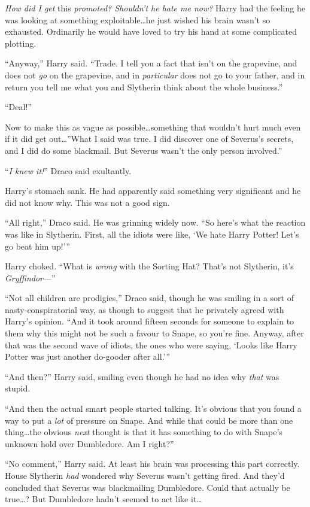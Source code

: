 \emph{How did I get} this \emph{promoted? Shouldn’t he hate me now?} Harry had the feeling he was looking at something exploitable…he just wished his brain wasn’t so exhausted. Ordinarily he would have loved to try his hand at some complicated plotting.

“Anyway,” Harry said. “Trade. I tell you a fact that isn’t on the grapevine, and does not \emph{go} on the grapevine, and in \emph{particular} does not go to your father, and in return you tell me what you and Slytherin think about the whole business.”

“Deal!”

Now to make this as vague as possible…something that wouldn’t hurt much even if it did get out…”What I said was true. I did discover one of Severus’s secrets, and I did do some blackmail. But Severus wasn’t the only person involved.”

“\emph{I knew it!}” Draco said exultantly.

Harry’s stomach sank. He had apparently said something very significant and he did not know why. This was not a good sign.

“All right,” Draco said. He was grinning widely now. “So here’s what the reaction was like in Slytherin. First, all the idiots were like, ‘We hate Harry Potter! Let’s go beat him up!’”

Harry choked. “What is \emph{wrong} with the Sorting Hat? That’s not Slytherin, it’s \emph{Gryffindor}—”

“Not all children are prodigies,” Draco said, though he was smiling in a sort of nasty-conspiratorial way, as though to suggest that he privately agreed with Harry’s opinion. “And it took around fifteen seconds for someone to explain to them why this might not be such a favour to Snape, so you’re fine. Anyway, after that was the second wave of idiots, the ones who were saying, ‘Looks like Harry Potter was just another do-gooder after all.’”

“And then?” Harry said, smiling even though he had no idea why \emph{that} was stupid.

“And then the actual smart people started talking. It’s obvious that you found a way to put a \emph{lot} of pressure on Snape. And while that could be more than one thing…the obvious \emph{next} thought is that it has something to do with Snape’s unknown hold over Dumbledore. Am I right?”

“No comment,” Harry said. At least his brain was processing this part correctly. House Slytherin \emph{had} wondered why Severus wasn’t getting fired. And they’d concluded that Severus was blackmailing Dumbledore. Could that actually be true…? But Dumbledore hadn’t seemed to act like it…

